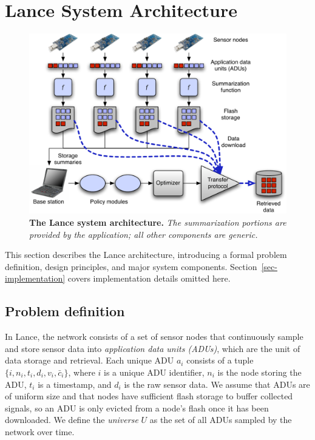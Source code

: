 \section{Lance System Architecture}
\label{sec-architecture}

\begin{figure}[t]
\begin{center}
\includegraphics[width=1.0\hsize]{./6-lance/figs/new-arch.pdf}
\end{center}
\caption{\small {\bf The Lance system architecture.} {\em The
summarization portions are provided by the
application; all other components are generic.}}
\label{fig-architecture}
\end{figure}

This section describes the Lance architecture, introducing a
formal problem definition, design principles, and major system components.
Section~\ref{sec-implementation} covers implementation details omitted here.

\subsection{Problem definition}
\label{sec-problem-definition}

In Lance, the network consists of a set of sensor nodes that continuously
sample and store sensor data into {\em application data units (ADUs)}, which
are the unit of data storage and retrieval.  Each unique ADU $a_i$ consists
of a tuple $\{ i, n_i, t_i, d_i, v_i, \bar{c}_i \}$, 
where $i$ is a unique ADU identifier,
$n_i$ is the node storing the ADU, $t_i$ is a timestamp, and $d_i$ is the raw
sensor data.  We assume that ADUs are of uniform size and that nodes 
have sufficient flash storage to buffer collected signals, so an 
ADU is only evicted from a node's flash once it has been downloaded.
We define the {\em universe} $U$ as the set of all ADUs sampled by the 
network over time. 

